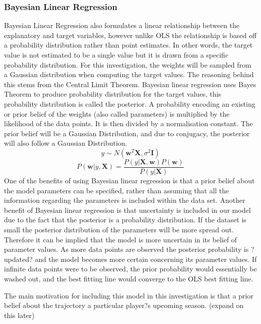 \documentclass[a4paper,11pt,twoside]{article}
\begin{document}
\subsubsection{Bayesian Linear Regression}
Bayesian Linear Regression also formulates a linear relationship between the explanatory and target variables, however unlike OLS the relationship is based off a probability distribution rather than point estimates. In other words, the target value is not estimated to be a single value but it is drawn from a specific probability distribution. For this investigation, the weights will be sampled from a Gaussian distribution when computing the target values. The reasoning behind this stems from the Central Limit Theorem. Bayesian linear regression uses Bayes Theorem to produce probability distribution for the target values, this probability distribution is called the posterior. A probability encoding an existing or prior belief of the weights (also called parameters) is multiplied by the likelihood of the data points. It is then divided by a normalisation constant. The prior belief will be a Gaussian Distribution, and due to conjugacy, the posterior will also follow a Gaussian Distribution. 
\begin{equation}
 y \sim N(\textbf{w}^T\textbf{X}, \sigma^2\textbf{I})
\end{equation}
\begin{equation}
P(\textbf{w}|y,\textbf{X}) = \frac{P(y|\textbf{X},\textbf{w})P(\textbf{w})}{P(y|\textbf{X})}
\end{equation}
One of the benefits of using Bayesian linear regression is that a prior belief about the model parameters can be specified, rather than assuming that all the information regarding the parameters is included within the data set. Another benefit of Bayesian linear regression is that uncertainty is included in our model due to the fact that the posterior is a probability distribution. If the dataset is small the posterior distribution of the parameters will be more spread out. Therefore it can be implied that the model is more uncertain in its belief of parameter values. As more data points are observed the posterior probability is ?updated? and the model becomes more certain concerning its parameter values. If infinite data points were to be observed, the prior probability would essentially be washed out, and the best fitting line would converge to the OLS best fitting line.

The main motivation for including this model in this investigation is that a prior belief about the trajectory a particular player?s upcoming season. (expand on this later)
\end{document}
